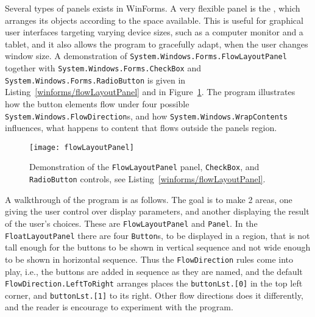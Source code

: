Several types of panels exists in WinForms. A very flexible panel is the , which arranges its objects according to the space available. This is useful for graphical user interfaces targeting varying device sizes, such as a computer monitor and a tablet, and it also allows the program to gracefully adapt, when the user changes window size. A demonstration of \lstinline{System.Windows.Forms.FlowLayoutPanel} together with \lstinline{System.Windows.Forms.CheckBox} and \lstinline{System.Windows.Forms.RadioButton} is given in Listing~\ref{winforms/flowLayoutPanel} and in Figure~\ref{fig:flowLayoutPanel}. The program illustrates how the button elements flow under four possible \lstinline{System.Windows.FlowDirection}s, and how \lstinline{System.Windows.WrapContents} influences, what happens to content that flows outside the panels region. 
%
%
%
%
\begin{figure}
  \centering
  \texttt{[image: flowLayoutPanel]}
  \caption{Demonstration of the \lstinline!FlowLayoutPanel! panel, \lstinline!CheckBox!, and \lstinline!RadioButton! controls, see Listing~\ref{winforms/flowLayoutPanel}.}
  \label{fig:flowLayoutPanel}
\end{figure}
A walkthrough of the program is as follows. The goal is to make 2 areas, one giving the user control over display parameters, and another displaying the result of the user's choices. These are \lstinline{FlowLayoutPanel} and \lstinline{Panel}. In the \lstinline{FloatLayoutPanel} there are four \lstinline{Button}s, to be displayed in a region, that is not tall enough for the buttons to be shown in vertical sequence and not wide enough to be shown in horizontal sequence. Thus the \lstinline{FlowDirection} rules come into play, i.e., the buttons are added in sequence as they are named, and the default \lstinline{FlowDirection.LeftToRight} arranges places the \lstinline{buttonLst.[0]} in the top left corner, and \lstinline{buttonLst.[1]} to its right. Other flow directions does it differently, and the reader is encourage to experiment with the program.

